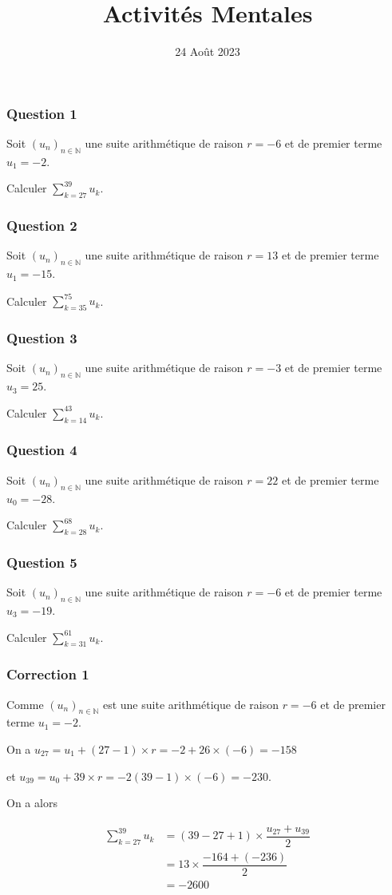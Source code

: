 \documentclass[15pt, mathserif]{beamer}
\title{Activités Mentales}
\date{24 Août 2023}
\begin{document}
\begin{frame}
    \titlepage
\end{frame}

\begin{frame} 
	\frametitle{Question 1}
Soit $(u_n)_{n\in\mathbb{N}}$ une suite arithmétique de raison $r = -6$ et de premier terme $u_1 = -2$.

Calculer $\displaystyle\sum_{k=27}^{39}u_k$.\end{frame}


\begin{frame} 
	\frametitle{Question 2}
Soit $(u_n)_{n\in\mathbb{N}}$ une suite arithmétique de raison $r = 13$ et de premier terme $u_1 = -15$.

Calculer $\displaystyle\sum_{k=35}^{75}u_k$.\end{frame}


\begin{frame} 
	\frametitle{Question 3}
Soit $(u_n)_{n\in\mathbb{N}}$ une suite arithmétique de raison $r = -3$ et de premier terme $u_3 = 25$.

Calculer $\displaystyle\sum_{k=14}^{43}u_k$.\end{frame}


\begin{frame} 
	\frametitle{Question 4}
Soit $(u_n)_{n\in\mathbb{N}}$ une suite arithmétique de raison $r = 22$ et de premier terme $u_0 = -28$.

Calculer $\displaystyle\sum_{k=28}^{68}u_k$.\end{frame}


\begin{frame} 
	\frametitle{Question 5}
Soit $(u_n)_{n\in\mathbb{N}}$ une suite arithmétique de raison $r = -6$ et de premier terme $u_3 = -19$.

Calculer $\displaystyle\sum_{k=31}^{61}u_k$.\end{frame}


\begin{frame}
\vspace{-10mm}
	\frametitle{Correction 1}
Comme $(u_n)_{n\in\mathbb{N}}$ est une suite arithmétique de raison $r = -6$ et de premier terme $u_1=-2$.

 On a $u_{27}= u_1+(27-1)\times r = -2+26\times\left(-6\right) = -158$ 

 et $u_{39} = u_0 + 39\times r = -2(39-1)\times\left(-6\right) = -230$.

On a alors

\begin{align*}\displaystyle\sum_{k=27}^{39} u_k &= (39-27+1) \times \dfrac{u_{27}+u_{39}}{2}\\
	&=13\times \dfrac{-164+\left(-236\right)}{2}\\
	&=-2600
\end{align*}\end{frame}
\end{document}
